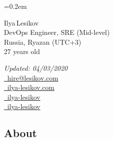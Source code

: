\documentclass[11pt, a4paper]{article}
\newcommand{\Delimitline}{
  \vspace{-2ex}
  \noindent\makebox[\linewidth]{\rule{\DelimitlineLength}{0.12ex}} }
\begin{document}
\sffamily

\font=0.2em

\newlength{\DelimitlineLength}
\setlength{\DelimitlineLength}{\textwidth+1em}

\pagecolor[RGB]{245,245,245}


{\setlength\multicolsep{0pt}\begin{multicols}{2}
    \begin{spacing}{1.6}\raggedright\rmfamily
    {\huge \vphantom{Name: }Ilya\,Lesikov}\\[1.8ex]
    {\Large \vphantom{Title: }DevOps Engineer, SRE (Mid-level)}\\
    {\Large \vphantom{Location: }Russia, Ryazan (UTC+3)}\\
    {\Large \vphantom{Age: }27 years old}
  \end{spacing}

  \columnbreak

  \begin{flushright}\begin{spacing}{1.3}\rmfamily
    \textit{Updated: 04/03/2020}\\[0.5ex]
    \large{
      \vphantom{contacts, contact information: }
      \faEnvelope \href{mailto:hire@lesikov.com}{\vphantom{Email: }\ hire@lesikov.com}\\
      \faInternetExplorer \href{https://ilya-lesikov.com}{\vphantom{Website: }\ ilya-lesikov.com}\\
      \faLinkedin \href{https://www.linkedin.com/in/ilya-lesikov}{\vphantom{LinkedIn: }\ ilya-lesikov}\\
      \faGithubAlt \href{https://github.com/ilya-lesikov}{\vphantom{GitHub: }\ ilya-lesikov}}
  \end{spacing}\end{flushright}
\end{multicols}}

\vspace{2ex}


\subsection*{About\vphantom{ (professional summary)}}
\Delimitline
\end{document}
